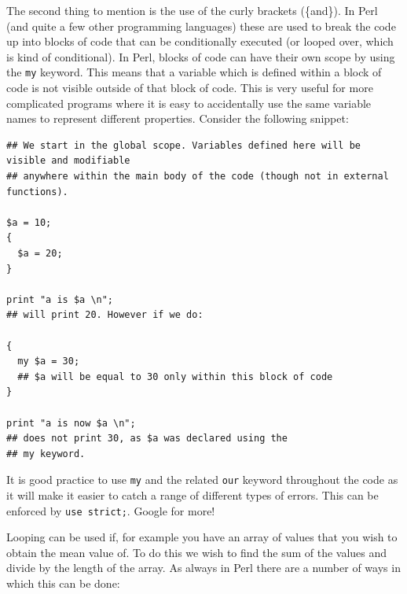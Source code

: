 \documentclass[11pt]{article}
\begin{document}
The second thing to mention is the use of the curly brackets (\{and\}). In
Perl (and quite a few other programming languages) these are used to
break the code up into blocks of code that can be conditionally executed
(or looped over, which is kind of conditional). In Perl, blocks of code
can have their own scope by using the \texttt{my} keyword. This means that a
variable which is defined within a block of code is not visible outside
of that block of code. This is very useful for more complicated programs
where it is easy to accidentally use the same variable names to represent
different properties.
Consider the following snippet:

\begin{verbatim}
## We start in the global scope. Variables defined here will be visible and modifiable
## anywhere within the main body of the code (though not in external functions).

$a = 10;
{
  $a = 20;
}

print "a is $a \n";
## will print 20. However if we do:

{
  my $a = 30;
  ## $a will be equal to 30 only within this block of code
}

print "a is now $a \n";
## does not print 30, as $a was declared using the
## my keyword.
\end{verbatim}

It is good practice to use \texttt{my} and the related \texttt{our} keyword throughout
the code as it will make it easier to catch a range of different types
of errors. This can be enforced by \texttt{use strict;}. Google for more!

Looping can be used if, for example you have an array of values that you wish to
obtain the mean value of. To do this we wish to find the sum of the
values and divide by the length of the array. As always in Perl there
are a number of ways in which this can be done:
\end{document}

